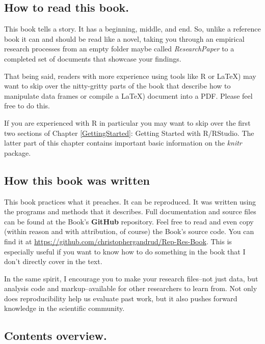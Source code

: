 \documentclass[ChapterTOCs,krantz1]{krantz}\usepackage{graphicx, color}
\begin{document}
\subsection{How to read this book.}

This book tells a story. It has a beginning, middle, and end. So, unlike a reference book it can and should be read like a novel, taking you through an empirical research processes from an empty folder maybe called {\emph{ResearchPaper}} to a completed set of documents that showcase your findings.

That being said, readers with more experience using tools like R or \LaTeX) may want to skip over the nitty-gritty parts of the book that describe how to manipulate data frames or compile a \LaTeX) document into a PDF. Please feel free to do this.

If you are experienced with R in particular you may want to skip over the first two sections of Chapter \ref{GettingStarted}: Getting Started with R/RStudio. The latter part of this chapter contains important basic information on the {\emph{knitr}} package. 

\subsection{How this book was written}

This book practices what it preaches. It can be reproduced. It was written using the programs and methods that it describes. Full documentation and source files can be found at the Book's \textbf{GitHub} repository. Feel free to read and even copy (within reason and with attribution, of course) the Book's source code. You can find it at \url{https://github.com/christophergandrud/Rep-Res-Book}. This is especially useful if you want to know how to do something in the book that I don't directly cover in the text.

In the same spirit, I encourage you to make your research files--not just data, but analysis code and markup--available for other researchers to learn from. Not only does reproducibility help us evaluate past work, but it also pushes forward knowledge in the scientific community.

\subsection{Contents overview.}

\end{document}
